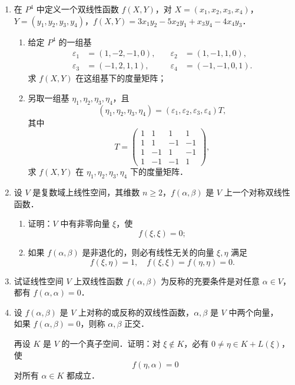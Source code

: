 \begin{enumerate}
  \item 在 $P^4$ 中定义一个双线性函数 $f(X,Y)$，对 $X=(x_1,x_2,x_3,x_4)$，$Y=(y_1,y_2,y_3,y_4)$，$f(X,Y)=3x_1y_2-5x_2y_1+x_3y_4-4x_4y_3$．
  \begin{enumerate}
    \item 给定 $P^4$ 的一组基
    \[
      \begin{aligned}
        \varepsilon_1&=(1,-2,-1,0),&\quad \varepsilon_2&=(1,-1,1,0),\\
        \varepsilon_3&=(-1,2,1,1),&\quad \varepsilon_4&=(-1,-1,0,1).
      \end{aligned}
    \]
    求 $f(X,Y)$ 在这组基下的度量矩阵；
  \anssub
    \item 另取一组基 $\eta_1,\eta_2,\eta_3,\eta_4$，且
    \[
      (\eta_1,\eta_2,\eta_3,\eta_4)=(\varepsilon_1,\varepsilon_2,\varepsilon_3,\varepsilon_4)T,
    \]
    其中
    \[
      T=\begin{pmatrix}
        1 & 1 & 1 & 1 \\
        1 & 1 & -1 & -1 \\
        1 & -1 & 1 & -1 \\
        1 & -1 & -1 & 1
      \end{pmatrix},
    \]
    求 $f(X,Y)$ 在 $\eta_1,\eta_2,\eta_3,\eta_4$ 下的度量矩阵．
  \anssub
  \end{enumerate}

  \item 设 $V$ 是复数域上线性空间，其维数 $n\geq 2$，$f(\alpha,\beta)$ 是 $V$ 上一个对称双线性函数．
  \begin{enumerate}
    \item 证明：$V$ 中有非零向量 $\xi$，使
    \[
      f(\xi,\xi)=0;
    \]
  \anssub
    \item 如果 $f(\alpha,\beta)$ 是非退化的，则必有线性无关的向量 $\xi,\eta$ 满足
    \[
      f(\xi,\eta)=1,\quad f(\xi,\xi)=f(\eta,\eta)=0.
    \]
  \anssub
  \end{enumerate}

  \item 试证线性空间 $V$ 上双线性函数 $f(\alpha,\beta)$ 为反称的充要条件是对任意 $\alpha\in V$，都有 $f(\alpha,\alpha)=0$．

  \ansproof
  \item 设 $f(\alpha,\beta)$ 是 $V$ 上对称的或反称的双线性函数，$\alpha,\beta$ 是 $V$ 中两个向量，\\
  如果 $f(\alpha,\beta)=0$，则称 $\alpha,\beta$ 正交．\par
  再设 $K$ 是 $V$ 的一个真子空间．证明：对 $\xi\notin K$，必有 $0\neq\eta\in K+L(\xi)$，使
  \[
    f(\eta,\alpha)=0
  \]
  对所有 $\alpha\in K$ 都成立．


\end{enumerate}
